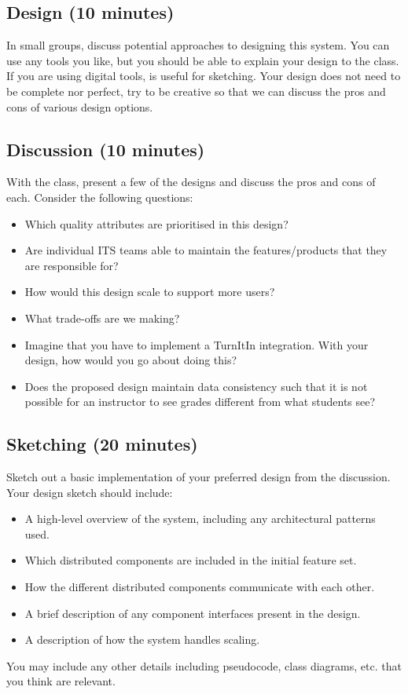\documentclass{csse4400}
\begin{document}
\subsection*{Design (10 minutes)}
In small groups, discuss potential approaches to designing this system.
You can use any tools you like,
but you should be able to explain your design to the class.
If you are using digital tools,
 is useful for sketching.
Your design does not need to be complete nor perfect,
try to be creative so that we can discuss the pros and cons of various design options.


\subsection*{Discussion (10 minutes)}
With the class, present a few of the designs and discuss the pros and cons of each.
Consider the following questions:
\begin{itemize}
\item Which quality attributes are prioritised in this design?
\item Are individual ITS teams able to maintain the features/products that they are responsible for?
\item How would this design scale to support more users?
\item What trade-offs are we making?
\item Imagine that you have to implement a TurnItIn integration.
    With your design, how would you go about doing this?
\item Does the proposed design maintain data consistency such that it is not possible for an instructor to see grades different from what students see?
\end{itemize}

\subsection*{Sketching (20 minutes)}
Sketch out a basic implementation of your preferred design from the discussion.
Your design sketch should include:
\begin{itemize}
\item A high-level overview of the system, including any architectural patterns used.
\item Which distributed components are included in the initial feature set.
\item How the different distributed components communicate with each other.
\item A brief description of any component interfaces present in the design.
\item A description of how the system handles scaling.
\end{itemize}
You may include any other details including pseudocode, class diagrams, etc. that you think are relevant.
\end{document}

